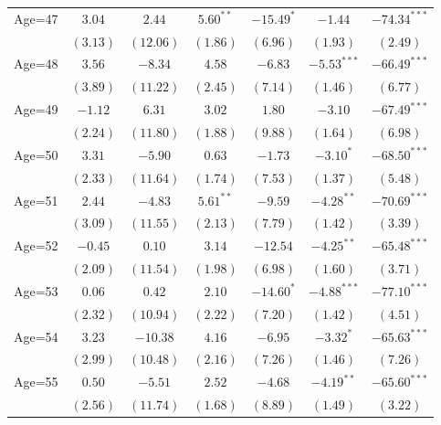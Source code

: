 \documentclass[fullpage]{paper}
\begin{document}
\begin{center}
\begin{longtable}{l c c c c c c }
Age=47      & $3.04$       & $2.44$       & $5.60^{**}$  & $-15.49^{*}$  & $-1.44$       & $-74.34^{***}$ \\
            & $(3.13)$     & $(12.06)$    & $(1.86)$     & $(6.96)$      & $(1.93)$      & $(2.49)$       \\
Age=48      & $3.56$       & $-8.34$      & $4.58$       & $-6.83$       & $-5.53^{***}$ & $-66.49^{***}$ \\
            & $(3.89)$     & $(11.22)$    & $(2.45)$     & $(7.14)$      & $(1.46)$      & $(6.77)$       \\
Age=49      & $-1.12$      & $6.31$       & $3.02$       & $1.80$        & $-3.10$       & $-67.49^{***}$ \\
            & $(2.24)$     & $(11.80)$    & $(1.88)$     & $(9.88)$      & $(1.64)$      & $(6.98)$       \\
Age=50      & $3.31$       & $-5.90$      & $0.63$       & $-1.73$       & $-3.10^{*}$   & $-68.50^{***}$ \\
            & $(2.33)$     & $(11.64)$    & $(1.74)$     & $(7.53)$      & $(1.37)$      & $(5.48)$       \\
Age=51      & $2.44$       & $-4.83$      & $5.61^{**}$  & $-9.59$       & $-4.28^{**}$  & $-70.69^{***}$ \\
            & $(3.09)$     & $(11.55)$    & $(2.13)$     & $(7.79)$      & $(1.42)$      & $(3.39)$       \\
Age=52      & $-0.45$      & $0.10$       & $3.14$       & $-12.54$      & $-4.25^{**}$  & $-65.48^{***}$ \\
            & $(2.09)$     & $(11.54)$    & $(1.98)$     & $(6.98)$      & $(1.60)$      & $(3.71)$       \\
Age=53      & $0.06$       & $0.42$       & $2.10$       & $-14.60^{*}$  & $-4.88^{***}$ & $-77.10^{***}$ \\
            & $(2.32)$     & $(10.94)$    & $(2.22)$     & $(7.20)$      & $(1.42)$      & $(4.51)$       \\
Age=54      & $3.23$       & $-10.38$     & $4.16$       & $-6.95$       & $-3.32^{*}$   & $-65.63^{***}$ \\
            & $(2.99)$     & $(10.48)$    & $(2.16)$     & $(7.26)$      & $(1.46)$      & $(7.26)$       \\
Age=55      & $0.50$       & $-5.51$      & $2.52$       & $-4.68$       & $-4.19^{**}$  & $-65.60^{***}$ \\
            & $(2.56)$     & $(11.74)$    & $(1.68)$     & $(8.89)$      & $(1.49)$      & $(3.22)$       \\

\end{longtable}
\end{center}
\end{document}
